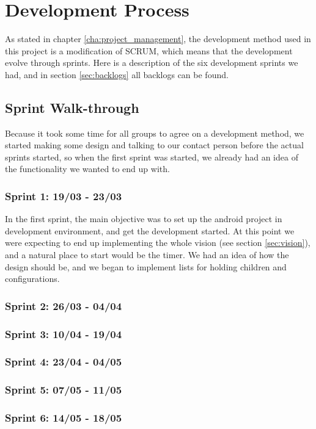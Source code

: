 \chapter{Development Process}
As stated in chapter \ref{cha:project_management}, the development method used in this project is a modification of SCRUM, which means that the development evolve through sprints. Here is a description of the six development sprints we had, and in section \ref{sec:backlogs} all backlogs can be found.

\section{Sprint Walk-through}
Because it took some time for all groups to agree on a development method, we started making some design and talking to our contact person before the actual sprints started, so when the first sprint was started, we already had an idea of the functionality we wanted to end up with.

\subsection*{Sprint 1: 19/03 - 23/03}
In the first sprint, the main objective was to set up the android project in development environment, and get the development started. At this point we were expecting to end up implementing the whole vision (see section \ref{sec:vision}), and a natural place to start would be the timer. We had an idea of how the design should be, and we began to implement lists for holding children and configurations.

\subsection*{Sprint 2: 26/03 - 04/04}


\subsection*{Sprint 3: 10/04 - 19/04}

\subsection*{Sprint 4: 23/04 - 04/05}

\subsection*{Sprint 5: 07/05 - 11/05} 

\subsection*{Sprint 6: 14/05 - 18/05}
